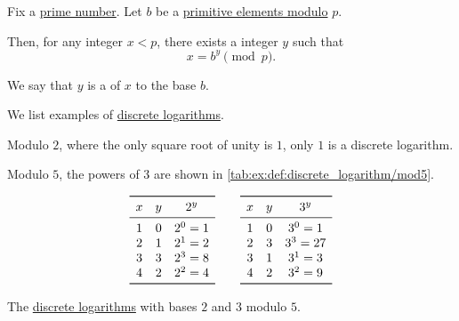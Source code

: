 \begin{definition}\label{def:discrete_logarithm}
  Fix a \hyperref[def:prime_number]{prime number}. Let \( b \) be a \hyperref[def:finite_field_primitive_element]{primitive elements modulo} \( p \).

  Then, for any  integer \( x < p \), there exists a  integer \( y \) such that
  \begin{equation}\label{eq:def:discrete_logarithm}
    x = b^y \pmod p.
  \end{equation}

  We say that \( y \) is a  of \( x \) to the base \( b \).
\end{definition}

\begin{example}\label{ex:def:discrete_logarithm}
  We list examples of \hyperref[def:discrete_logarithm]{discrete logarithms}.
  \begin{thmenum}
     Modulo \( 2 \), where the only square root of unity is \( 1 \), only \( 1 \) is a discrete logarithm.

     Modulo \( 5 \), the powers of \( 3 \) are shown in \cref{tab:ex:def:discrete_logarithm/mod5}.

    \begin{table}[!ht]
      \begin{equation*}
        \begin{array}{*{3}c}
          \toprule
          x & y & 2^y \\
          \midrule
          1 & 0 & 2^0 = 1 \\
          2 & 1 & 2^1 = 2 \\
          3 & 3 & 2^3 = 8 \\
          4 & 2 & 2^2 = 4 \\
          \bottomrule
        \end{array}
        \qquad
        \begin{array}{*{3}c}
          \toprule
          x & y & 3^y \\
          \midrule
          1 & 0 & 3^0 = 1 \\
          2 & 3 & 3^3 = 27 \\
          3 & 1 & 3^1 = 3 \\
          4 & 2 & 3^2 = 9 \\
          \bottomrule
        \end{array}
      \end{equation*}
      \caption{The \hyperref[def:discrete_logarithm]{discrete logarithms} with bases \( 2 \) and \( 3 \) modulo \( 5 \).}\label{tab:ex:def:discrete_logarithm/mod5}
    \end{table}


\end{thmenum}
\end{example}
